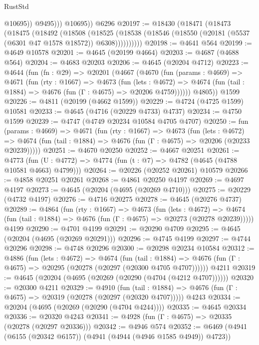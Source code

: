 \begin{lexlean}{RustStd}
\begin{coremodule}
                  @10695))
              @9495)))
        @10695))
    @6296
@20197 := @18430
    (@18471
      (@18473
        (@18475
          (@18492
            (@18508
              (@18525
                (@18538 (@18546 (@18550 (@20181 (@5537 (@6301 @47 @1578 @18572)) @6308))))))))))
@20198 := @4641 @564
@20199 := @4649 @10578
@20201 := @4645 (@20199 @4664)
@20203 := @4687 (@4688 @564)
@20204 := @4683 @20203
@20206 := @4645 (@20204 @4712)
@20223 := @4644
    (fun (fn : @29) =>
    @20201
      (@4667
        (@4670
          (fun (params : @4669) =>
          @4671
            (fun (rty : @1667) =>
            @4673
              (fun (lets : @4672) =>
              @4674 (fun (tail : @1884) => @4676 (fun (Γ : @4675) => @20206 @4759))))))
        @4805))
    @1599
@20226 := @4811 (@20199 (@4662 @1599))
@20229 := @4724 (@4725 @1599) @10581
@20233 := @4645 (@4716 (@20229 @4733) @4737)
@20234 := @4750 @1599
@20239 := @4747 (@4749 @20234 @10584 @4705 @4707)
@20250 := fun (params : @4669) =>
  @4671
    (fun (rty : @1667) =>
    @4673
      (fun (lets : @4672) =>
      @4674 (fun (tail : @1884) => @4676 (fun (Γ : @4675) => @20206 (@20233 @20239)))))
@20251 := @4670 @20250
@20252 := @4667 @20251
@20261 := @4773
    (fun (U : @4772) => @4774 (fun (t : @7) => @4782 (@4645 (@4788 @10581 @4663) @4799)))
@20264 := @20226 (@20252 @20261) @10579
@20266 := @4858 @20251 @20261
@20268 := @4861 @20250 @4197
@20269 := @4697 @4197
@20273 := @4645 (@20204 (@4695 (@20269 @4710)))
@20275 := @20229 (@4732 @4197)
@20276 := @4716 @20275
@20278 := @4645 (@20276 @4737)
@20289 := @4864
    (fun (rty : @1667) =>
    @4673
      (fun (lets : @4672) =>
      @4674 (fun (tail : @1884) => @4676 (fun (Γ : @4675) => @20273 (@20278 @20239)))))
    @4199
@20290 := @4701 @4199
@20291 := @20290 @4709
@20295 := @4645 (@20204 (@4695 (@20269 @20291)))
@20296 := @4745 @4199
@20297 := @4744 @20296
@20298 := @4748 @20296
@20300 := @20298 @20234 @10584
@20312 := @4886
    (fun (lets : @4672) =>
    @4674
      (fun (tail : @1884) =>
      @4676 (fun (Γ : @4675) => @20295 (@20278 (@20297 (@20300 @4705 @4707))))))
    @4211
@20319 := @4645 (@20204 (@4695 (@20269 (@20290 (@4704 (@4212 @4707))))))
@20320 := @20300 @4211
@20329 := @4910
    (fun (tail : @1884) => @4676 (fun (Γ : @4675) => @20319 (@20278 (@20297 (@20320 @4707)))))
    @4243
@20334 := @20204 (@4695 (@20269 (@20290 (@4704 @4244))))
@20335 := @4645 @20334
@20336 := @20320 @4243
@20341 := @4928 (fun (Γ : @4675) => @20335 (@20278 (@20297 @20336)))
@20342 := @4946 @574
@20352 := @6469 (@4941 (@6155 (@20342 @6157)) (@4941 (@4944 (@4946 @1585 @4949)) @4723))

\end{coremodule}
\end{lexlean}
